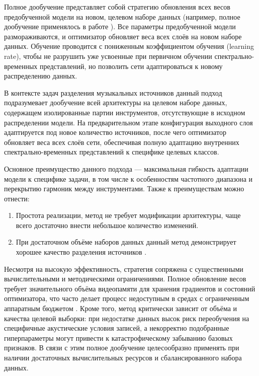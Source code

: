 \documentclass[14pt]{extarticle}
\begin{document}
Полное дообучение представляет собой стратегию обновления всех весов предобученной модели на новом,
 целевом наборе данных (например, полное дообучение применялось в работе \cite{finetune_piano_guitar}). 
 Все параметры предобученной модели размораживаются, и оптимизатор обновляет веса всех слоёв на
 новом наборе данных. 
 Обучение проводится с пониженным коэффициентом обучения (learning rate), 
 чтобы не разрушить уже усвоенные при первичном обучении спектрально-временных представлений, 
 но позволить сети адаптироваться к новому распределению данных.

В контексте задач разделения музыкальных источников данный подход подразумевает дообучение всей 
архитектуры на целевом наборе данных, содержащем изолированные партии инструментов, отсутствующие в 
исходном распределении модели. 
На предварительном этапе конфигурация выходного слоя адаптируется под новое количество источников, после
 чего оптимизатор обновляет веса всех слоёв сети, обеспечивая полную адаптацию внутренних спектрально-временных
представлений к специфике целевых классов.

Основное преимущество данного подхода — максимальная гибкость адаптации модели к специфике задачи,
 в том числе к особенностям частотного диапазона и перекрытию гармоник между инструментами. 
Также к преимуществам можно отнести:
\begin{enumerate}[label=\arabic*)]
  \item Простота реализации, метод не требует модификации архитектуры, чаще всего достаточно внести небольшое количество 
  изменений.
  \item При достаточном объёме наборов данных данный метод демонстрирует хорошее качество разделения источников \cite{demucs, finetune-2024}.
\end{enumerate}

Несмотря на высокую эффективность, стратегия сопряжена с существенными вычислительными и методическими ограничениями. 
Полное обновление весов требует значительного объёма видеопамяти для хранения градиентов и состояний оптимизатора,
 что часто делает процесс недоступным в средах с ограниченным аппаратным бюджетом \cite{LoRA}.
Кроме того, метод критически зависит от объёма и качества целевой выборки: при недостатке данных высок риск 
переобучения на специфичные акустические условия записей, а некорректно подобранные гиперпараметры могут привести к катастрофическому 
забыванию базовых признаков. 
В связи с этим полное дообучение целесообразно применять при наличии достаточных вычислительных ресурсов и сбалансированного 
набора данных.
\end{document}
